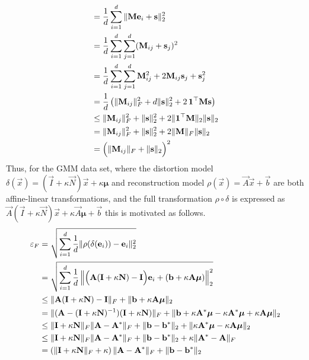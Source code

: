 \begin{align*}
    &= \frac 1 d \sum_{i=1}^d \|\vec M \vec e_i + \vec s\|^2_2 \\
    &= \frac 1 d \sum_{i=1}^d \sum_{j=1}^d ( \vec M_{ij} + \vec s_j )^2 \\
    &= \frac 1 d \sum_{i=1}^d \sum_{j=1}^d \vec M_{ij}^2 + 2 \vec M_{ij} \vec s_j + \vec s_j^2 \\
    &= \frac 1 d \left (\| \vec M_{ij} \|_F^2 + d \| \vec s \|_2^2 + 2 \, \vec 1^\top \vec M \vec s \right )\\
    &\leq \| \vec M_{ij} \|_F^2 + \| \vec s \|_2^2 + 2 \|\vec 1^\top \vec M\|_2 \|\vec s\|_2\\
    &= \| \vec M_{ij} \|_F^2 + \| \vec s \|_2^2 + 2 \|\vec M\|_F \|\vec s\|_2\\
    &= \Bigl ( \| \vec M_{ij} \|_F + \| \vec s \|_2 \Bigr )^2
\end{align*}
Thus, for the GMM data set, where the distortion model $\delta(\vec x) = (\vec I + \kappa \vec N) \vec x + \kappa \boldsymbol \mu$
and reconstruction model $\rho(\vec x) = \vec A \vec x + \vec b$ are both 
affine-linear transformations, and the full transformation $\rho \circ \delta$ 
is expressed as $\vec A (\vec I + \kappa \vec N) \vec x + \kappa \vec A \boldsymbol \mu + \vec b$
this is motivated as follows.
\begin{align*}
    \varepsilon_F 
    &= \sqrt{ \sum_{i=1}^d \frac 1 d \|\rho(\delta (\vec e_i)) - \vec e_i \|_2^2 } \\
    &= \sqrt{ \sum_{i=1}^d \frac 1 d \left \| \Bigl ( \vec A (\vec I + \kappa \vec N) - \vec I \Bigr )\vec e_i 
        + (\vec b + \kappa \vec A \boldsymbol \mu ) \right \|_2^2} \\
    &\leq \| \vec A (\vec I + \kappa \vec N) - \vec I \|_F
        + \| \vec b + \kappa \vec A \boldsymbol \mu \|_2 \\
    &= \|(\vec A  - (\vec I + \kappa \vec N)^{-1})  (\vec I + \kappa \vec N)\|_F
        + \| \vec b + \kappa \vec A^* \boldsymbol \mu - \kappa \vec A^* \boldsymbol \mu + \kappa \vec A \boldsymbol \mu \|_2 \\
    &\leq \| \vec I + \kappa \vec N \|_F \|\vec A  - \vec A^* \|_F
        + \| \vec b - \vec b^*\|_2 + \| \kappa \vec A^* \boldsymbol \mu - \kappa \vec A \boldsymbol \mu \|_2 \\
    &\leq \| \vec I + \kappa \vec N \|_F \|\vec A  - \vec A^* \|_F
        + \| \vec b - \vec b^*\|_2 + \kappa \| \vec A^* - \vec A \|_F \\
    &= \left (\| \vec I + \kappa \vec N\|_F  + \kappa \right ) \|\vec A  - \vec A^* \|_F
        + \| \vec b - \vec b^*\|_2 \\
\end{align*}
